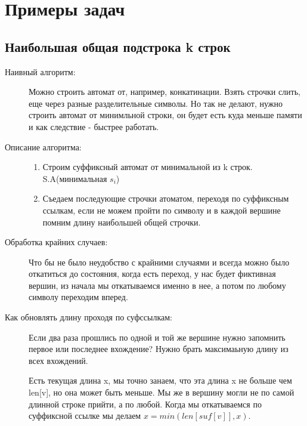 \section{Примеры задач}
\subsection{Наибольшая общая подстрока k строк}
    \begin{description}
    \item[Наивный алгоритм:] Можно строить автомат от, например, конкатинации. Взять 
     строчки слить, еще через разные разделительные символы. Но так не 
     делают, нужно строить автомат от минимльной строки, он будет есть 
     куда меньше памяти и как следствие - быстрее работать. 
    
    \item [Описание алгоритма:\\]
    \begin{enumerate}
    \item Строим суффиксный автомат от минимальной из k строк. S.A(минимальная $s_i$)
    
    \item  %
    
    Съедаем последующие строчки атоматом, переходя по суффиксным ссылкам, если не 
    можем пройти по символу и в каждой вершине помним длину наибольшей общей строчки. 
    \end{enumerate}

    \item [Обработка крайних случаев:]
    Что бы не было неудобство с крайними случаями и всегда можно было откатиться 
    до состояния, когда есть переход, у нас будет фиктивная вершин, из начала мы откатываемся 
    именно в нее, а потом по любому символу переходим вперед. 
    
    \item [Как обновлять длину проходя по суфссылкам:]
    Если два раза прошлись по одной и той же вершине нужно запомнить первое или последнее вхождение?
    Нужно брать максимаьную длину из всех вхождений. 
    
    Есть текущая длина x, мы точно занаем, что эта длина x не больше
    чем len[v], но она может быть меньше. Мы же в вершину могли
    не по самой длинной строке прийти, а по любой. Когда мы
    откатываемся по суффиксной ссылке мы делаем $x = min(len[suf[v]], x)$. 
    

\end{description}
